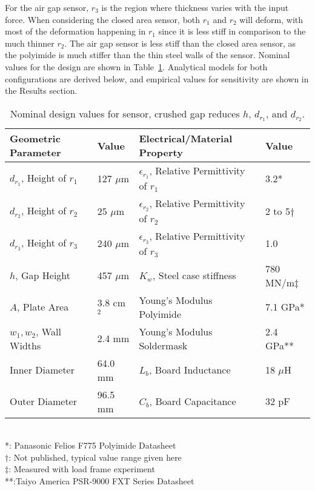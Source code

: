 For the air gap sensor, $r_3$ is the region where thickness varies with the input force.
When considering the closed area sensor, both $r_1$ and $r_2$ will deform, with most of the
deformation happening in $r_1$ since it is less stiff in comparison to the much thinner $r_2$. 
The air gap sensor is less stiff than the closed area sensor, as the polyimide is 
much stiffer than the thin steel walls of the sensor.
Nominal values for the design are shown in Table~\ref{tab:values}.
Analytical models for both configurations are derived below,
 and empirical values for sensitivity are shown in the Results section.

\begin{table}[]
{\centering
\caption{Nominal design values for sensor, crushed gap reduces $h$, $d_{r_1}$, and $d_{r_2}$.}
\label{tab:values}
\begin{tabular}{|l|l||l|l|}
\hline
Geometric Parameter & Value & Electrical/Material Property & Value \\ \hline
$d_{r_1}$, Height of $r_1$    & 127 $\mu$m & $\epsilon_{r_1}$, Relative Permittivity of $r_1$ & 3.2*  \\ \hline
$d_{r_2}$, Height of $r_2$    & 25  $\mu$m  & $\epsilon_{r_2}$, Relative Permittivity of $r_2$ & 2 to 5$\dagger$  \\ \hline
$d_{r_3}$, Height of $r_3$    & 240 $\mu$m & $\epsilon_{r_3}$, Relative Permittivity of $r_3$ & 1.0  \\ \hline
$h$, Gap Height    & 457 $\mu$m   &   $K_w$, Steel case stiffness & 780 MN/m$\ddagger$       \\ \hline
$A$, Plate Area    & 3.8 cm$^2$   &  Young's Modulus Polyimide          & 7.1 GPa*         \\ \hline
$w_1, w_2$, Wall Widths   & 2.4 mm   &   Young's Modulus Soldermask  & 2.4 GPa** \\ \hline
Inner Diameter   & 64.0 mm   &     $L_b$, Board Inductance      & 18 $\mu$H    \\ \hline
Outer Diameter   & 96.5 mm &      $C_b$, Board Capacitance    & 32 pF             \\ \hline 
\end{tabular}
} \\ 
\footnotesize{*: Panasonic Felios F775 Polyimide Datasheet} \\
\footnotesize{$\dagger$: Not published, typical value range given here}\\
\footnotesize{$\ddagger$: Measured with load frame experiment}\\
\footnotesize{**:Taiyo America PSR-9000 FXT Series Datasheet}\\
\end{table}

